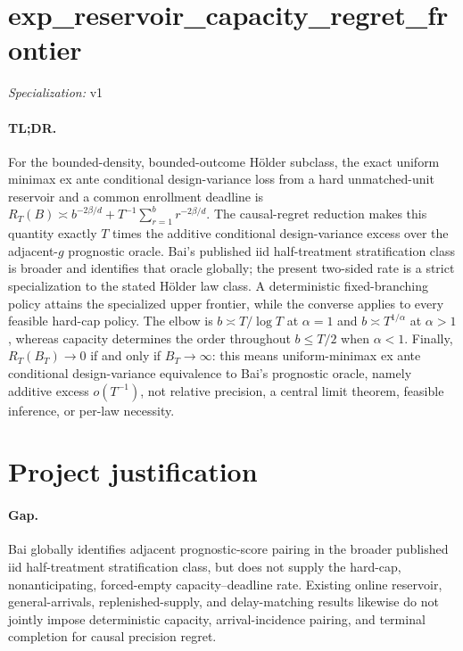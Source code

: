 \documentclass{article}
\begin{document}
\sloppy

\section*{exp\_\allowbreak{}reservoir\_\allowbreak{}capacity\_\allowbreak{}regret\_\allowbreak{}frontier}

\noindent\textit{Specialization:} v1\par

\paragraph{TL;DR.} For the bounded-density, bounded-outcome Hölder subclass, the exact uniform minimax ex ante conditional design-variance loss from a hard unmatched-unit reservoir and a common enrollment deadline is \(R_T(B)\asymp b^{-2\beta/d}+T^{-1}\sum_{r=1}^{b}r^{-2\beta/d}\). The causal-regret reduction makes this quantity exactly \(T\) times the additive conditional design-variance excess over the adjacent-\(g\) prognostic oracle. Bai's published iid half-treatment stratification class is broader and identifies that oracle globally; the present two-sided rate is a strict specialization to the stated Hölder law class. A deterministic fixed-branching policy attains the specialized upper frontier, while the converse applies to every feasible hard-cap policy. The elbow is \(b\asymp T/\log T\) at \(\alpha=1\) and \(b\asymp T^{1/\alpha}\) at \(\alpha>1\), whereas capacity determines the order throughout \(b\le T/2\) when \(\alpha<1\). Finally, \(R_T(B_T)\to0\) if and only if \(B_T\to\infty\): this means uniform-minimax ex ante conditional design-variance equivalence to Bai's prognostic oracle, namely additive excess \(o(T^{-1})\), not relative precision, a central limit theorem, feasible inference, or per-law necessity.

\section{Project justification}

\paragraph{Gap.} Bai globally identifies adjacent prognostic-score pairing in the broader published iid half-treatment stratification class, but does not supply the hard-cap, nonanticipating, forced-empty capacity--deadline rate. Existing online reservoir, general-arrivals, replenished-supply, and delay-matching results likewise do not jointly impose deterministic capacity, arrival-incidence pairing, and terminal completion for causal precision regret.
\end{document}
